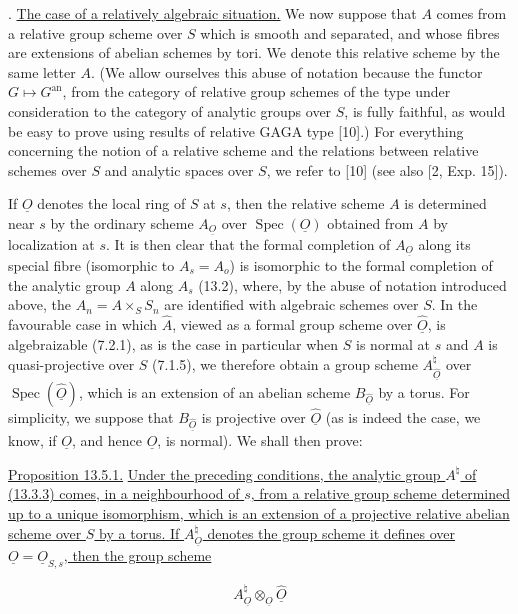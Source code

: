 \medskip
{}. \underline{The case of a relatively algebraic situation.}
We now suppose that $A$ comes from a relative group scheme over $S$
which is smooth and separated, and whose fibres are extensions of
abelian schemes by tori.  We denote this relative scheme by the same
letter $A$.  (We allow ourselves this abuse of notation because the
functor $G\longmapsto G^{\mathrm{an}}$, from the category of relative
group schemes of the type under consideration to the category of
analytic groups over $S$, is fully faithful, as would be easy to prove
using results of relative GAGA type [10].)  For everything concerning
the notion of a relative scheme and the relations between relative
schemes over $S$ and analytic spaces over $S$, we refer to [10] (see
also [2, Exp. 15]).

If $\underline O$ denotes the local ring of $S$ at $s$, then the
relative scheme $A$ is determined near $s$ by the ordinary scheme
$A_{\underline O}$ over $\operatorname{Spec}(\underline O)$ obtained
from $A$ by localization at $s$.  It is then clear that the formal
completion of $A_{\underline O}$ along its special fibre (isomorphic to
$A_s=A_o$) is isomorphic to the formal completion of the analytic group
$A$ along $A_s$ (13.2), where, by the abuse of notation introduced
above, the $A_n=A\times_S S_n$ are identified with algebraic schemes
over $S$.  In the favourable case in which $\hat A$, viewed as a formal
group scheme over $\hat{\underline O}$, is algebraizable (7.2.1), as is
the case in particular when $S$ is normal at $s$ and $A$ is
quasi-projective over $S$ (7.1.5), we therefore obtain a group scheme
$A^{\natural}_{\hat{\underline O}}$ over
$\operatorname{Spec}(\hat{\underline O})$, which is an extension of an
abelian scheme $B_{\hat{\underline O}}$ by a torus.  For simplicity, we
suppose that $B_{\hat{\underline O}}$ is projective over
$\hat{\underline O}$ (as is indeed the case, we know, if
$\underline O$, and hence $\hat{\underline O}$, is normal).  We shall
then prove:

\medskip
\noindent
\underline{Proposition 13.5.1.} \underline{Under the preceding
conditions, the analytic group $A^{\natural}$ of (13.3.3) comes, in a
neighbourhood of $s$, from a relative group scheme determined up to a
unique isomorphism, which is an extension of a projective relative
abelian scheme over $S$ by a torus.  If
$A^{\natural}_{\underline O}$ denotes the group scheme it defines over
$\underline O=\underline O_{S,s}$, then the group scheme}

\begin{equation*}
 A^{\natural}_{\underline O}\otimes_{\underline O}
 \hat{\underline O}
\end{equation*}

